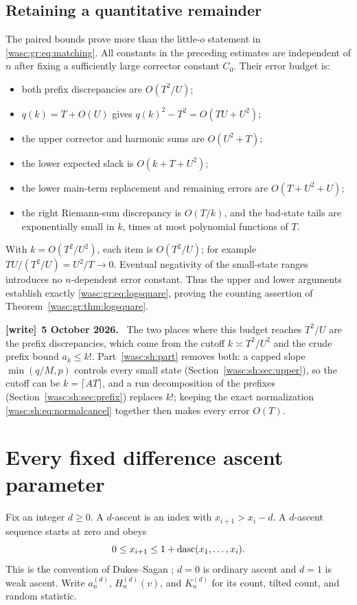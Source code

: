 \documentclass[11pt,a4paper]{article}
\theoremstyle{remark}\newtheorem{remark}[theorem]{Remark}
\numberwithin{equation}{section}
\newenvironment{writenote}[1][]{\par\smallskip\begingroup\small
 \noindent\textbf{[write]}\if\relax\detokenize{#1}\relax\else~\textbf{#1.}\fi\ }%
 {\par\endgroup\smallskip}
\begin{document}
\subsection{Retaining a quantitative remainder}\label{wasc:gr:sec:quantitative}
The paired bounds prove more than the little-$o$ statement in \eqref{wasc:gr:eq:matching}. All constants in the preceding estimates are independent of $n$ after fixing a sufficiently large corrector constant $C_0$. Their error budget is:
\begin{itemize}[leftmargin=*,itemsep=3pt]
\item both prefix discrepancies are $O(T^2/U)$;
\item $q(k)=T+O(U)$ gives $q(k)^2-T^2=O(TU+U^2)$;
\item the upper corrector and harmonic sums are $O(U^2+T)$;
\item the lower expected slack is $O(k+T+U^2)$;
\item the lower main-term replacement and remaining errors are $O(T+U^2+U)$;
\item the right Riemann-sum discrepancy is $O(T/k)$, and the bad-state tails are exponentially small in $k$, times at most polynomial functions of $T$.
\end{itemize}
With $k=O(T^2/U^2)$, each item is $O(T^2/U)$; for example $TU/(T^2/U)=U^2/T\to0$. Eventual negativity of the small-state ranges introduces no $n$-dependent error constant. Thus the upper and lower arguments establish exactly \eqref{wasc:gr:eq:logsquare}, proving the counting assertion of Theorem~\ref{wasc:gr:thm:logsquare}.
\begin{writenote}[5 October 2026]
The two places where this budget reaches $T^2/U$ are the prefix discrepancies, which come from the cutoff $k\asymp T^2/U^2$ and the crude prefix bound $a_k\le k!$. Part~\ref{wasc:sh:part} removes both: a capped slope $\min(q/M,p)$ controls every small state (Section~\ref{wasc:sh:sec:upper}), so the cutoff can be $k=\lceil AT\rceil$, and a run decomposition of the prefixes (Section~\ref{wasc:sh:sec:prefix}) replaces $k!$; keeping the exact normalization \eqref{wasc:sh:eq:normalcancel} together then makes every error $O(T)$.
\end{writenote}

\section{Every fixed difference ascent parameter}\label{wasc:gr:sec:fixedd}
Fix an integer $d\ge0$. A $d$-ascent is an index with $x_{i+1}>x_i-d$. A $d$-ascent sequence starts at zero and obeys
\begin{equation}\label{wasc:gr:eq:ddef}
0\le x_{i+1}\le1+\operatorname{dasc}(x_1,\ldots,x_i).
\end{equation}
This is the convention of Dukes--Sagan \cite{dukes}; $d=0$ is ordinary ascent and $d=1$ is weak ascent. Write $a_n^{(d)}$, $H_n^{(d)}(v)$, and $K_n^{(d)}$ for its count, tilted count, and random statistic.
\end{document}
